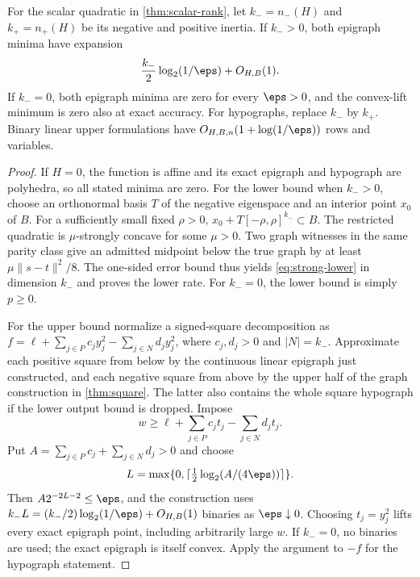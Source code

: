 \begin{theorem}\label{thm:inertia}
For the scalar quadratic in \cref{thm:scalar-rank}, let
$k_-=n_-(H)$ and $k_+=n_+(H)$ be its negative and positive inertia.
If $k_->0$, both epigraph minima have expansion
\[
 \frac{k_-}{2}\log_2(1/\eps)+O_{H,B}(1).
\]
If $k_-=0$, both epigraph minima are zero for every $\eps>0$, and the
convex-lift minimum is zero also at exact accuracy. For hypographs,
replace $k_-$ by $k_+$. Binary linear upper formulations have
$O_{H,B,n}(1+\log(1/\eps))$ rows and variables.
\end{theorem}
\begin{proof}
If $H=0$, the function is affine and its exact epigraph and hypograph
are polyhedra, so all stated minima are zero. For the lower bound when
$k_->0$, choose an orthonormal basis $T$ of the negative eigenspace and an
interior point $x_0$ of $B$. For a sufficiently small fixed $\rho>0$,
$x_0+T[-\rho,\rho]^{k_-}\subset B$. The restricted quadratic is
$\mu$-strongly concave for some $\mu>0$. Two graph witnesses in the
same parity class give an admitted midpoint below the true graph by
at least $\mu\|s-t\|^2/8$. The one-sided error bound thus yields
\eqref{eq:strong-lower} in dimension $k_-$ and proves the lower rate.
For $k_-=0$, the lower bound is simply $p\ge0$.

For the upper bound normalize a signed-square decomposition as
$f=\ell+\sum_{j\in P}c_jy_j^2-\sum_{j\in N}d_jy_j^2$,
where $c_j,d_j>0$ and $|N|=k_-$. Approximate each positive square
from below by the continuous linear epigraph just constructed, and
each negative square from above by the upper half of the graph
construction in \cref{thm:square}. The latter also contains the whole
square hypograph if the lower output bound is dropped. Impose
\[
 w\ge\ell+\sum_{j\in P}c_jt_j-\sum_{j\in N}d_jt_j.
\]
Put $A=\sum_{j\in P}c_j+\sum_{j\in N}d_j>0$ and choose
\[
 L=\max\{0,\lceil\tfrac12\log_2(A/(4\eps))\rceil\}.
\]
Then $A2^{-2L-2}\le\eps$, and the construction uses
$k_-L=(k_-/2)\log_2(1/\eps)+O_{H,B}(1)$ binaries as
$\eps\downarrow0$. Choosing $t_j=y_j^2$ lifts every exact epigraph
point, including arbitrarily large $w$. If $k_-=0$, no binaries are
used; the exact epigraph is itself convex. Apply the argument to $-f$
for the hypograph statement.
\end{proof}


